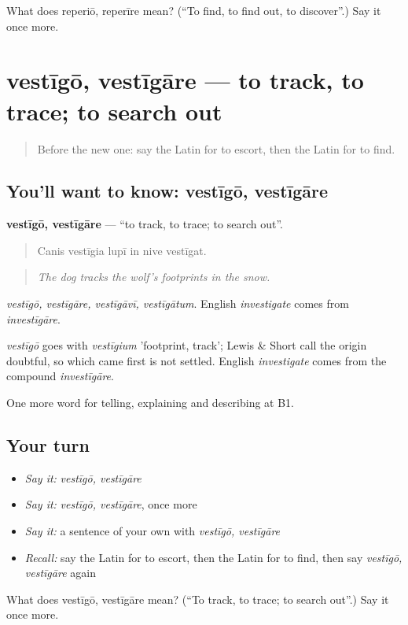 \begin{tcolorbox}[breakable,colback=teal!4,colframe=teal!35!black,title={Before you move on}]
What does reperiō, reperīre mean? (\textquotedblleft{}To find, to find out, to discover\textquotedblright{}.) Say it once more.
\end{tcolorbox}
\section[vestīgō, vestīgāre]{vestīgō, vestīgāre — to track, to trace; to search out}

\label{lesson:LA-C453-vestigo}



\begin{quote}
Before the new one: say the Latin for to escort, then the Latin for to find.
\end{quote}

\subsection*{You'll want to know: vestīgō, vestīgāre}
\textbf{vestīgō, vestīgāre} — \textquotedblleft{}to track, to trace; to search out\textquotedblright{}.

\begin{quote}
Canis vestīgia lupī in nive vestīgat.
\end{quote}

\begin{quote}
\emph{The dog tracks the wolf's footprints in the snow.}
\end{quote}

\emph{vestīgō, vestīgāre, vestīgāvī, vestīgātum}. English \emph{investigate} comes from \emph{investīgāre}.

\begin{cousinweb}
\emph{vestīgō} goes with \emph{vestīgium} 'footprint, track'; Lewis \& Short call the origin doubtful, so which came first is not settled. English \emph{investigate} comes from the compound \emph{investīgāre}.
\end{cousinweb}

\begin{grammarlens}[title={What you've built}]
One more word for telling, explaining and describing at B1.
\end{grammarlens}

\subsection*{Your turn}
\begin{itemize}
\raggedright
  \item \emph{Say it:} \emph{vestīgō, vestīgāre}
  \item \emph{Say it:} \emph{vestīgō, vestīgāre}, once more
  \item \emph{Say it:} a sentence of your own with \emph{vestīgō, vestīgāre}
  \item \emph{Recall:} say the Latin for to escort, then the Latin for to find, then say \emph{vestīgō, vestīgāre} again
\end{itemize}

\begin{tcolorbox}[breakable,colback=teal!4,colframe=teal!35!black,title={Before you move on}]
What does vestīgō, vestīgāre mean? (\textquotedblleft{}To track, to trace; to search out\textquotedblright{}.) Say it once more.
\end{tcolorbox}
